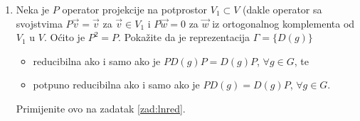 \begin{enumerate}[label=\arabic{chapter}.\arabic*.]
\item Neka je $P$ operator projekcije na potprostor $V_1 \subset V$ (dakle operator sa svojstvima
$P \vec{v} = \vec{v}$ za $\vec{v}\in V_1$ i $P \vec{w} = 0$ za $\vec{w}$ iz ortogonalnog komplementa
od $V_1$ u $V$. Oćito je $P^2 = P$. Pokažite  da je reprezentacija $\Gamma = \{D(g)\}$ 
\begin{itemize}
\item reducibilna ako i samo ako je $PD(g)P = D(g)P$, $\forall g\in G$, te
\item potpuno reducibilna ako i samo ako je $PD(g) = D(g)P$, $\forall g\in G$.
\end{itemize}
Primijenite ovo na zadatak \ref{zad:lnred}.

\end{enumerate}

